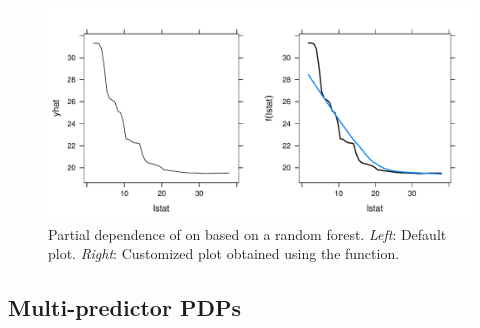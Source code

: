 \begin{figure}[!htbp]
  \centering
  \includegraphics[width=1.0\linewidth]{pd_lstat}
  \caption{Partial dependence of  on  based on a random forest. \textit{Left}: Default plot. \textit{Right}: Customized plot obtained using the  function.}
  \label{fig:pd_lstat}
\end{figure}


\subsection{Multi-predictor PDPs}
\label{sec:multi}

